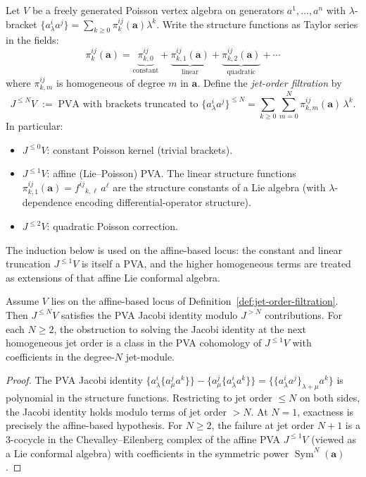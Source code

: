 \begin{definition}
\label{def:jet-order-filtration}
Let $V$ be a freely generated Poisson vertex algebra on generators
$a^1,\ldots,a^n$ with $\lambda$-bracket
$\{a^i_\lambda a^j\}=\sum_{k\ge 0}\pi^{ij}_k(\boldsymbol{a})\lambda^k$.
Write the structure functions as Taylor series in the fields:
\[
\pi^{ij}_k(\boldsymbol{a})
=
\underbrace{\pi^{ij}_{k,0}}_{\text{constant}}
+
\underbrace{\pi^{ij}_{k,1}(\boldsymbol{a})}_{\text{linear}}
+
\underbrace{\pi^{ij}_{k,2}(\boldsymbol{a})}_{\text{quadratic}}
+
\cdots
\]
where $\pi^{ij}_{k,m}$ is homogeneous of degree $m$ in $\boldsymbol{a}$.
Define the \emph{jet-order filtration} by
\[
J^{\le N}V
\;:=\;
\text{PVA with brackets truncated to }
\{a^i_\lambda a^j\}^{\le N}
=
\sum_{k\ge 0}\sum_{m=0}^{N}\pi^{ij}_{k,m}(\boldsymbol{a})\,\lambda^k.
\]
In particular:
\begin{itemize}
\item $J^{\le 0}V$: constant Poisson kernel (trivial brackets).
\item $J^{\le 1}V$: affine (Lie--Poisson) PVA. The linear structure
 functions $\pi^{ij}_{k,1}(\boldsymbol{a})=f^{ij}{}_{k,\ell}\,a^\ell$
 are the structure constants of a Lie algebra (with $\lambda$-dependence
 encoding differential-operator structure).
\item $J^{\le 2}V$: quadratic Poisson correction.
\end{itemize}
The induction below is used on the affine-based locus: the constant and
linear truncation $J^{\le 1}V$ is itself a PVA, and the higher
homogeneous terms are treated as extensions of that affine Lie conformal
algebra.
\end{definition}

\begin{lemma}
\label{lem:jet-jacobi}
Assume $V$ lies on the affine-based locus of Definition~\ref{def:jet-order-filtration}. Then
$J^{\le N}V$ satisfies the PVA Jacobi identity modulo $J^{>N}$
contributions. For each $N\ge 2$, the obstruction to solving the
Jacobi identity at the next homogeneous jet order is a class in the PVA
cohomology of $J^{\le 1}V$ with coefficients in the degree-$N$
jet-module.
\end{lemma}

\begin{proof}
The PVA Jacobi identity
$\{a^i_\lambda\{a^j_\mu a^k\}\}-\{a^j_\mu\{a^i_\lambda a^k\}\}
=\{\{a^i_\lambda a^j\}_{\lambda+\mu}a^k\}$
is polynomial in the structure functions. Restricting to jet order
$\le N$ on both sides, the Jacobi identity holds modulo terms of jet
order $>N$. At $N=1$, exactness is precisely the affine-based
hypothesis. For $N\ge 2$, the failure at jet order $N+1$ is a $3$-cocycle in the
Chevalley--Eilenberg complex of the affine PVA $J^{\le 1}V$ (viewed as
a Lie conformal algebra) with coefficients in the symmetric power
$\operatorname{Sym}^{N}(\boldsymbol{a})$.
\end{proof}

